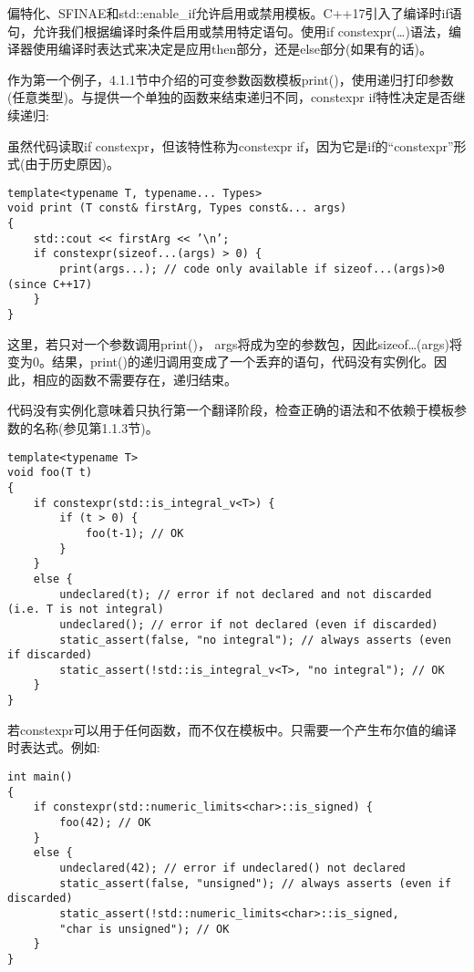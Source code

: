 偏特化、SFINAE和std::enable\_if允许启用或禁用模板。C++17引入了编译时if语句，允许我们根据编译时条件启用或禁用特定语句。使用if constexpr(…)语法，编译器使用编译时表达式来决定是应用then部分，还是else部分(如果有的话)。

作为第一个例子，4.1.1节中介绍的可变参数函数模板print()，使用递归打印参数(任意类型)。与提供一个单独的函数来结束递归不同，constexpr if特性决定是否继续递归:

\begin{tcolorbox}[colback=webgreen!5!white,colframe=webgreen!75!black]
\hspace*{0.75cm}虽然代码读取if constexpr，但该特性称为constexpr if，因为它是if的“constexpr”形式(由于历史原因)。
\end{tcolorbox}

\begin{lstlisting}[style=styleCXX]
template<typename T, typename... Types>
void print (T const& firstArg, Types const&... args)
{
	std::cout << firstArg << ’\n’;
	if constexpr(sizeof...(args) > 0) {
		print(args...); // code only available if sizeof...(args)>0 (since C++17)
	}
}
\end{lstlisting}

这里，若只对一个参数调用print()， args将成为空的参数包，因此sizeof…(args)将变为0。结果，print()的递归调用变成了一个丢弃的语句，代码没有实例化。因此，相应的函数不需要存在，递归结束。

代码没有实例化意味着只执行第一个翻译阶段，检查正确的语法和不依赖于模板参数的名称(参见第1.1.3节)。

\begin{lstlisting}[style=styleCXX]
template<typename T>
void foo(T t)
{
	if constexpr(std::is_integral_v<T>) {
		if (t > 0) {
			foo(t-1); // OK
		}
	}
	else {
		undeclared(t); // error if not declared and not discarded (i.e. T is not integral)
		undeclared(); // error if not declared (even if discarded)
		static_assert(false, "no integral"); // always asserts (even if discarded)
		static_assert(!std::is_integral_v<T>, "no integral"); // OK
	}
}
\end{lstlisting}

若constexpr可以用于任何函数，而不仅在模板中。只需要一个产生布尔值的编译时表达式。例如:

\begin{lstlisting}[style=styleCXX]
int main()
{
	if constexpr(std::numeric_limits<char>::is_signed) {
		foo(42); // OK
	}
	else {
		undeclared(42); // error if undeclared() not declared
		static_assert(false, "unsigned"); // always asserts (even if discarded)
		static_assert(!std::numeric_limits<char>::is_signed,
		"char is unsigned"); // OK
	}
}
\end{lstlisting}

